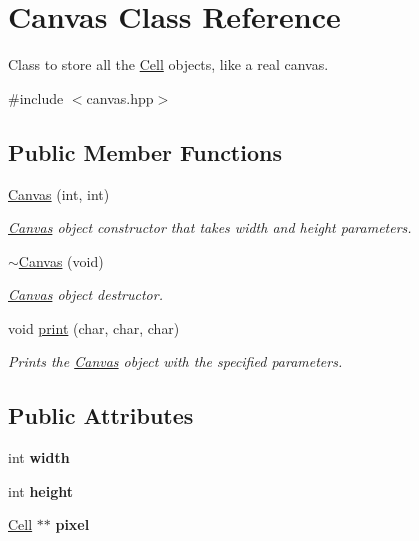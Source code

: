 \hypertarget{class_canvas}{}\section{Canvas Class Reference}
\label{class_canvas}


Class to store all the \mbox{\hyperlink{class_cell}{Cell}} objects, like a real canvas.  




{\ttfamily \#include $<$canvas.\+hpp$>$}

\subsection*{Public Member Functions}
\begin{DoxyCompactItemize}
\item 
\mbox{\hyperlink{class_canvas_aabb8ad56107413ecd614a311079b95a3}{Canvas}} (int, int)
\begin{DoxyCompactList}\small\item\em \mbox{\hyperlink{class_canvas}{Canvas}} object constructor that takes width and height parameters. \end{DoxyCompactList}\item 
\mbox{\label{class_canvas_a63c450c44bae6e3ff76a07ad0a15a750}} 
\mbox{\hyperlink{class_canvas_a63c450c44bae6e3ff76a07ad0a15a750}{$\sim$\+Canvas}} (void)
\begin{DoxyCompactList}\small\item\em \mbox{\hyperlink{class_canvas}{Canvas}} object destructor. \end{DoxyCompactList}\item 
void \mbox{\hyperlink{class_canvas_aaa8d62f6584a34128a28d33515d0c2a8}{print}} (char, char, char)
\begin{DoxyCompactList}\small\item\em Prints the \mbox{\hyperlink{class_canvas}{Canvas}} object with the specified parameters. \end{DoxyCompactList}\end{DoxyCompactItemize}
\subsection*{Public Attributes}
\begin{DoxyCompactItemize}
\item 
\mbox{\label{class_canvas_a31434dcd520abfa1c1f3fb778514d173}} 
int {\bfseries width}
\item 
\mbox{\label{class_canvas_aada7c1a775b50c422801d477e82a53ec}} 
int {\bfseries height}
\item 
\mbox{\label{class_canvas_a6aceffb7e2b6651380b60818ba77f834}} 
\mbox{\hyperlink{class_cell}{Cell}} $\ast$$\ast$ {\bfseries pixel}
\end{DoxyCompactItemize}


